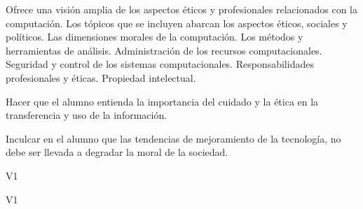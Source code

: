 \begin{syllabus}


\begin{justification}
Ofrece una visión amplia de los aspectos éticos y profesionales relacionados con la computación. Los tópicos que se incluyen abarcan los aspectos éticos, sociales y políticos. Las dimensiones morales de la computación. Los métodos y herramientas de análisis. Administración de los recursos computacionales. Seguridad y control de los sistemas computacionales. Responsabilidades profesionales y éticas. Propiedad intelectual.
\end{justification}

\begin{goals}
\item Hacer que el alumno entienda la importancia del cuidado y la ética en la transferencia y uso de la información.
\item Inculcar en el alumno que las tendencias de mejoramiento de la tecnología, no debe ser llevada a degradar la moral de la sociedad.
\end{goals}

\begin{outcomes}{V1}
    \item {}%
    \item {}
    \item {}
    \item {}
\end{outcomes}

\begin{competences}{V1}
    \item {}
    \item {}
    \item {}
    \item {}
    \item {}
    \item {}
    \item {}
    \item {}
\end{competences}


\end{syllabus}

